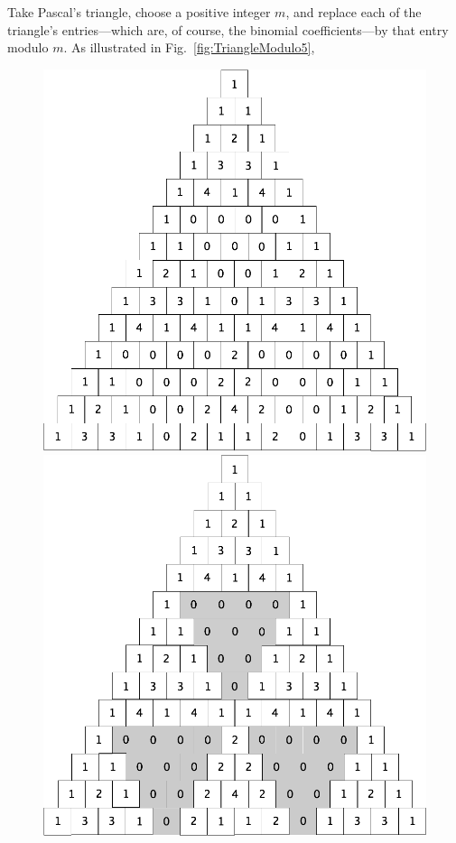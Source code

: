 \begin{enumerate}
Take Pascal's triangle, choose a positive integer $m$, and replace each of the triangle's entries---which are, of course, the binomial coefficients---by that entry modulo $m$.  As illustrated in Fig.~\ref{fig:TriangleModulo5},
\begin{figure}[ht]
\begin{center}
	\includegraphics[scale=0.18]{FiguresArithmetic/TrianglePascalModulo5init.png}
	\hspace*{.1in}
	\includegraphics[scale=0.18]{FiguresArithmetic/TrianglePascalModulo5.png}

\end{center}
\end{figure}
\end{enumerate}
